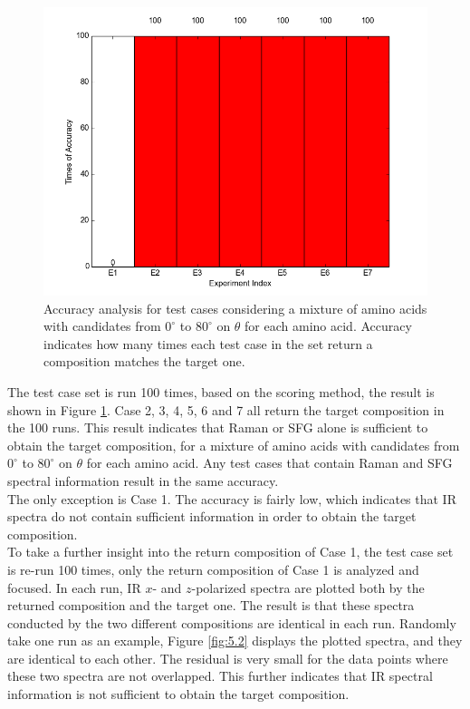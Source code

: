 \begin{figure}[!ht]
\centering
\includegraphics[scale=0.7]{Figures/accuracy_pecent_result8_mixture.png}
\caption{Accuracy analysis for test cases considering a mixture of amino acids with candidates from $0^{\circ}$ to $80^{\circ}$ on $\theta$ for each amino acid. Accuracy indicates how many times each test case in the set return a composition matches the target one.}  \label{fig:5.1}
\end{figure}

The test case set is run 100 times, based on the scoring method, the result is shown in 
Figure \ref{fig:5.1}. Case 2, 3, 4, 5, 6 and 7 all return the target composition in the 100 runs. This result indicates that Raman or SFG alone is sufficient to obtain the target composition, for a mixture of amino acids with candidates from $0^{\circ}$ to $80^{\circ}$ on $\theta$ for each amino acid. Any test cases that contain Raman and SFG spectral information result in the same accuracy. \\

The only exception is Case 1. The accuracy is fairly low, which indicates that IR spectra do not contain sufficient information in order to obtain the target composition. \\

To take a further insight into the return composition of Case 1, the test case set is re-run 100 times, only the return composition of Case 1 is analyzed and focused. In each run, IR $x$- and $z$-polarized spectra are plotted both by the returned composition and the target one. The result is that these spectra conducted by the two different compositions are identical in each run. Randomly take one run as an example, Figure \ref{fig:5.2} displays the plotted spectra, and they are identical to each other. The residual is very small for the data points where these two spectra are not overlapped. This further indicates that IR spectral information is not sufficient to obtain the target composition.\\

